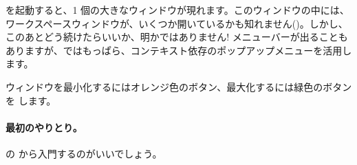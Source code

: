 \documentclass[a4paper,10pt,twoside]{book}
\begin{document}
\pharo を起動すると、1 個の大きなウィンドウが現れます。このウィンドウの中には、ワークスペースウィンドウが、いくつか開いているかも知れません()。しかし、このあとどう続けたらいいか、明かではありません!
メニューバーが出ることもありますが、\pharo ではもっぱら、コンテキスト依存のポップアップメニューを活用します。


ウィンドウを最小化するにはオレンジ色のボタン、最大化するには緑色のボタンを \click します。

\paragraph{最初のやりとり。}

 の から入門するのがいいでしょう。


\end{document}
